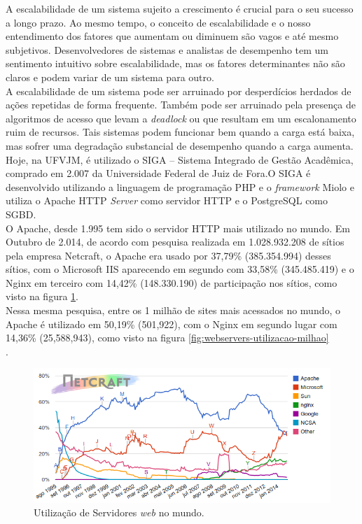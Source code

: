 A escalabilidade de um sistema sujeito a crescimento é crucial para o seu 
sucesso a longo prazo. Ao mesmo tempo, o conceito de escalabilidade e o nosso 
entendimento dos fatores que aumentam ou diminuem são vagos e até mesmo 
subjetivos. Desenvolvedores de sistemas e analistas de desempenho tem um 
sentimento intuitivo sobre escalabilidade, mas os fatores determinantes não são 
claros e podem variar de um sistema para outro.\\
A escalabilidade de um sistema pode ser arruinado por desperdícios herdados de 
ações repetidas de forma frequente. Também pode ser arruinado pela presença de 
algoritmos de acesso que levam a \textit{deadlock} ou que resultam em um 
escalonamento ruim de recursos. Tais sistemas podem funcionar bem quando a 
carga está baixa, mas sofrer uma degradação substancial de desempenho quando a 
carga aumenta.\\
Hoje, na UFVJM, é utilizado o SIGA – Sistema Integrado de Gestão Acadêmica, 
comprado em 2.007 da Universidade Federal de Juiz de Fora.O SIGA é desenvolvido 
utilizando a linguagem de programação PHP e o \textit{framework} Miolo e 
utiliza o Apache HTTP \textit{Server} como servidor HTTP e o PostgreSQL como 
SGBD.\\
O Apache, desde 1.995 tem sido o servidor HTTP mais utilizado no mundo. Em 
Outubro de 2.014, de acordo com pesquisa realizada em 1.028.932.208 de sítios 
pela empresa Netcraft, o Apache era usado por 37,79\% (385.354.994) desses 
sítios, com o Microsoft IIS aparecendo em segundo com 33,58\% (345.485.419) e o 
Nginx em terceiro com 14,42\% (148.330.190) de participação nos sítios, como 
visto na figura \ref{fig:webservers-utilizacao}.\\
Nessa mesma pesquisa, entre os 1 milhão de sites mais acessados no mundo, o 
Apache é utilizado em 50,19\% (501,922), com o Nginx em segundo lugar com 
14,36\% (25,588,943), como visto na figura 
\ref{fig:webservers-utilizacao-milhao}\\.
\begin{figure}[htb]
	\centering
	\includegraphics[width=0.6\linewidth]{figuras/grafico1}
	\caption{Utilização de Servidores \textit{web} no mundo.}
	\label{fig:webservers-utilizacao}
\end{figure}

